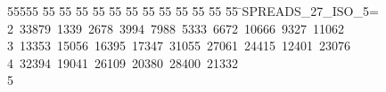 %
%
\begin{tabbing}
55555 \= 55 \= 55 \= 55 \= 55 \= 55 \= 55 \= 55 \= 55 \= 55 \= 55 \= 55 \= 55 \= \>SPREADS\_27\_ISO\_5=\\[0pt]
2\ 33879\ 1339\ 2678\ 3994\ 7988\ 5333\ 6672\ 10666\ 9327\ 11062\ \\[0pt]
3\ 13353\ 15056\ 16395\ 17347\ 31055\ 27061\ 24415\ 12401\ 23076\ \\[0pt]
4\ 32394\ 19041\ 26109\ 20380\ 28400\ 21332\\[0pt]
5\>\end{tabbing}
